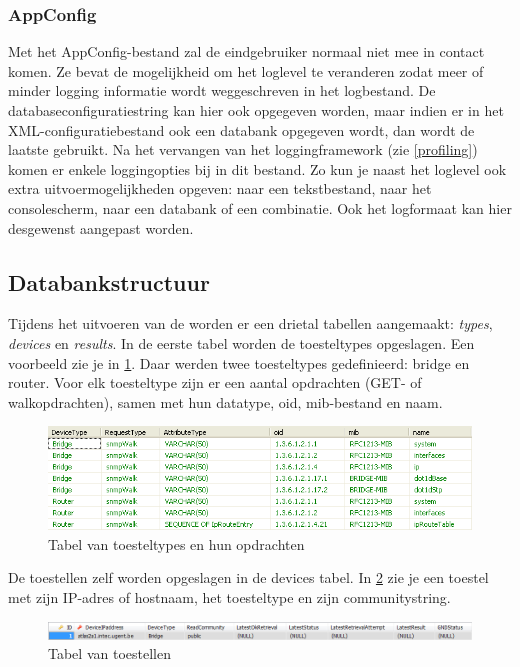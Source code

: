 \subsubsection{AppConfig}
Met het AppConfig-bestand zal de eindgebruiker normaal niet mee in contact komen.
Ze bevat de mogelijkheid om het loglevel te veranderen zodat meer of minder logging informatie wordt weggeschreven in het logbestand.
De databaseconfiguratiestring kan hier ook opgegeven worden,
maar indien er in het XML-configuratiebestand ook een databank opgegeven wordt, dan wordt de laatste gebruikt.
Na het vervangen van het loggingframework (zie \cref{profiling}) komen er enkele loggingopties bij in dit bestand.
Zo kun je naast het loglevel ook extra uitvoermogelijkheden opgeven: naar een tekstbestand, naar het consolescherm, naar een databank of een combinatie.
Ook het logformaat kan hier desgewenst aangepast worden.

\subsection{Databankstructuur}
\label{snmp-data-retriever-db}
Tijdens het uitvoeren van de \nwmretriever{} worden er een drietal tabellen aangemaakt: \textit{types}, \textit{devices} en \textit{results}.
In de eerste tabel worden de toesteltypes opgeslagen.
Een voorbeeld zie je in \cref{fig-db-types}.
Daar werden twee toesteltypes gedefinieerd: bridge en router.
Voor elk toesteltype zijn er een aantal opdrachten (GET- of walkopdrachten), samen met hun datatype, \gls{oid}, \gls{mib}-bestand en naam.

\begin{figure}[h]
	\centering
	\includegraphics[scale=0.50]{figures/database/types}
	\caption{Tabel van toesteltypes en hun opdrachten}
	\label{fig-db-types}
\end{figure}

De toestellen zelf worden opgeslagen in de devices tabel.
In \cref{fig-db-devices} zie je een toestel met zijn IP-adres of hostnaam, het toesteltype en zijn communitystring.

\begin{figure}[h]
	\centering
	\includegraphics[scale=0.40]{figures/database/devices}
	\caption{Tabel van toestellen}
	\label{fig-db-devices}
\end{figure}

